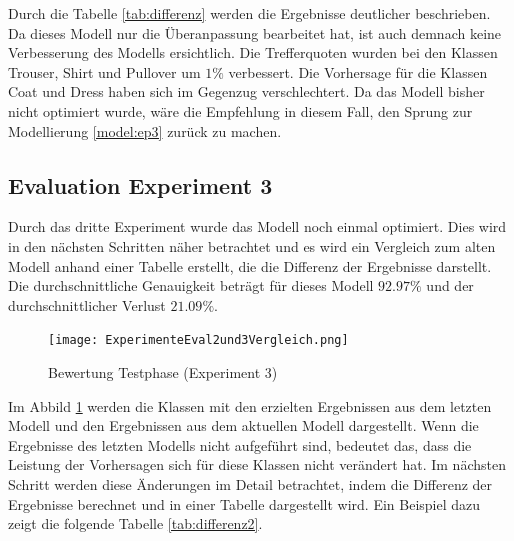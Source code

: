 \documentclass[12pt]{scrreprt}
\begin{document}
Durch die Tabelle \ref{tab:differenz} werden die Ergebnisse deutlicher beschrieben. Da dieses Modell nur die Überanpassung bearbeitet hat, ist auch demnach keine Verbesserung des Modells ersichtlich. Die Trefferquoten wurden bei den Klassen Trouser, Shirt und Pullover um $1\%$ verbessert. Die Vorhersage für die Klassen Coat und Dress haben sich im Gegenzug verschlechtert. Da das Modell bisher nicht optimiert wurde, wäre die Empfehlung in diesem Fall, den Sprung zur Modellierung \ref{model:ep3} zurück zu machen. 

\subsection{Evaluation Experiment 3}\label{eval:eval3}

Durch das dritte Experiment wurde das Modell noch einmal optimiert. Dies wird in den nächsten Schritten näher betrachtet und es wird ein Vergleich zum alten Modell anhand einer Tabelle erstellt, die die Differenz der Ergebnisse darstellt. Die durchschnittliche Genauigkeit beträgt für dieses Modell $92.97\%$ und der durchschnittlicher Verlust $21.09\%$.

\begin{figure}[h!]
	\centering
	\texttt{[image: ExperimenteEval2und3Vergleich.png]}
	\caption{ Bewertung Testphase \cite{HK22}(Experiment 3)}
	\label{fig:fig20}
\end{figure}

Im Abbild \ref{fig:fig20} werden die Klassen mit den erzielten Ergebnissen aus dem letzten Modell und den Ergebnissen aus dem aktuellen Modell dargestellt. Wenn die Ergebnisse des letzten Modells nicht aufgeführt sind, bedeutet das, dass die Leistung der Vorhersagen sich für diese Klassen nicht verändert hat. Im nächsten Schritt werden diese Änderungen im Detail betrachtet, indem die Differenz der Ergebnisse berechnet und in einer Tabelle dargestellt wird. Ein Beispiel dazu zeigt die folgende Tabelle \ref{tab:differenz2}.
\end{document}
